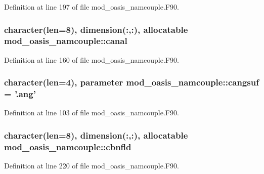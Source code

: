 Definition at line 197 of file mod\+\_\+oasis\+\_\+namcouple.\+F90.

\hypertarget{classmod__oasis__namcouple_a5eaa67fd4db1a3cde074adedd984ffbe}{
\subsubsection[{canal}]{\setlength{\rightskip}{0pt plus 5cm}character(len=8), dimension(\+:,\+:), allocatable mod\+\_\+oasis\+\_\+namcouple\+::canal\hspace{0.3cm}{\ttfamily [private]}}}\label{classmod__oasis__namcouple_a5eaa67fd4db1a3cde074adedd984ffbe}


Definition at line 160 of file mod\+\_\+oasis\+\_\+namcouple.\+F90.

\hypertarget{classmod__oasis__namcouple_a4b921aeee4d921557ab0cd2f0e541dad}{
\subsubsection[{cangsuf}]{\setlength{\rightskip}{0pt plus 5cm}character(len=4), parameter mod\+\_\+oasis\+\_\+namcouple\+::cangsuf = '.ang'\hspace{0.3cm}{\ttfamily [private]}}}\label{classmod__oasis__namcouple_a4b921aeee4d921557ab0cd2f0e541dad}


Definition at line 103 of file mod\+\_\+oasis\+\_\+namcouple.\+F90.

\hypertarget{classmod__oasis__namcouple_af5bfb0fe58a77461130b9967fa7a4d5e}{
\subsubsection[{cbnfld}]{\setlength{\rightskip}{0pt plus 5cm}character(len=8), dimension(\+:,\+:), allocatable mod\+\_\+oasis\+\_\+namcouple\+::cbnfld\hspace{0.3cm}{\ttfamily [private]}}}\label{classmod__oasis__namcouple_af5bfb0fe58a77461130b9967fa7a4d5e}


Definition at line 220 of file mod\+\_\+oasis\+\_\+namcouple.\+F90.

